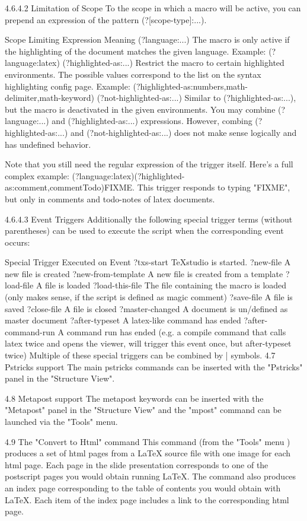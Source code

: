 \documentclass{article}
\begin{document}
	4.6.4.2 Limitation of Scope
	To the scope in which a macro will be active, you can prepend an expression of the pattern (?[scope-type]:...).
	
	Scope Limiting Expression	Meaning
	(?language:...)	The macro is only active if the highlighting of the document matches the given language.
	Example: (?language:latex)
	(?highlighted-as:...)	Restrict the macro to certain highlighted environments. The possible values correspond to the list on the syntax highlighting config page.
	Example: (?highlighted-as:numbers,math-delimiter,math-keyword)
	(?not-highlighted-as:...)	Similar to (?highlighted-as:...), but the macro is deactivated in the given environments.
	You may combine (?language:...) and (?highlighted-as:...) expressions. However, combing (?highlighted-as:...) and (?not-highlighted-as:...) does not make sense logically and has undefined behavior.
	
	Note that you still need the regular expression of the trigger itself. Here's a full complex example: (?language:latex)(?highlighted-as:comment,commentTodo)FIXME. This trigger responds to typing "FIXME", but only in comments and todo-notes of latex documents.
	
	4.6.4.3 Event Triggers
	Additionally the following special trigger terms (without parentheses) can be used to execute the script when the corresponding event occurs:
	
	Special Trigger	Executed on Event
	?txs-start	TeXstudio is started.
	?new-file	A new file is created
	?new-from-template	A new file is created from a template
	?load-file	A file is loaded
	?load-this-file	The file containing the macro is loaded (only makes sense, if the script is defined as magic comment)
	?save-file	A file is saved
	?close-file	A file is closed
	?master-changed	A document is un/defined as master document
	?after-typeset	A latex-like command has ended
	?after-command-run	A command run has ended (e.g. a compile command that calls latex twice and opens the viewer, will trigger this event once, but after-typeset twice)
	Multiple of these special triggers can be combined by | symbols.
	4.7 Pstricks support
	The main pstricks commands can be inserted with the "Pstricks" panel in the "Structure View".
	
	4.8 Metapost support
	The metapost keywords can be inserted with the "Metapost" panel in the "Structure View" and the "mpost" command can be launched via the "Tools" menu.
	
	4.9 The "Convert to Html" command
	This command (from the "Tools" menu ) produces a set of html pages from a LaTeX source file with one image for each html page. Each page in the slide presentation corresponds to one of the postscript pages you would obtain running LaTeX.
	The command also produces an index page corresponding to the table of contents you would obtain with LaTeX. Each item of the index page includes a link to the corresponding html page.
	
\end{document}
